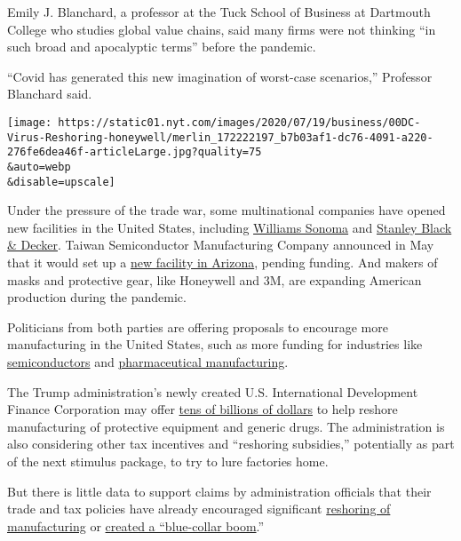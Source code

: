 Emily J. Blanchard, a professor at the Tuck School of Business at
Dartmouth College who studies global value chains, said many firms were
not thinking ``in such broad and apocalyptic terms'' before the
pandemic.

``Covid has generated this new imagination of worst-case scenarios,''
Professor Blanchard said.

\texttt{[image: https://static01.nyt.com/images/2020/07/19/business/00DC-Virus-Reshoring-honeywell/merlin\_172222197\_b7b03af1-dc76-4091-a220-276fe6dea46f-articleLarge.jpg?quality=75\\\&auto=webp\\\&disable=upscale]}

Under the pressure of the trade war, some multinational companies have
opened new facilities in the United States, including
\href{https://www.cnbc.com/2019/05/13/williams-sonoma-ceo-says-it-shifted-operations-ahead-of-tariff-hikes.html}{Williams
Sonoma} and
\href{https://www.wsj.com/articles/stanley-to-make-more-craftsman-tools-in-u-s-11557919800}{Stanley
Black \& Decker}. Taiwan Semiconductor Manufacturing Company announced
in May that it would set up a
\href{https://www.nytimes.com/2020/05/14/technology/trump-tsmc-us-chip-facility.html}{new
facility in Arizona}, pending funding. And makers of masks and
protective gear, like Honeywell and 3M, are expanding American
production during the pandemic.

Politicians from both parties are offering proposals to encourage more
manufacturing in the United States, such as more funding for industries
like
\href{https://www.nytimes.com/2020/06/11/business/economy/semiconductors-chips-congress-china.html}{semiconductors}
and
\href{https://www.nytimes.com/2020/03/11/business/economy/coronavirus-china-trump-drugs.html}{pharmaceutical
manufacturing}.

The Trump administration's newly created U.S. International Development
Finance Corporation may offer
\href{https://www.reuters.com/article/us-usa-trade-reshoring-exclusive/exclusive-u-s-development-agency-could-loan-billions-for-reshoring-official-says-idUSKBN23U31F}{tens
of billions of dollars} to help reshore manufacturing of protective
equipment and generic drugs. The administration is also considering
other tax incentives and ``reshoring subsidies,'' potentially as part of
the next stimulus package, to try to lure factories home.

But there is little data to support claims by administration officials
that their trade and tax policies have already encouraged significant
\href{https://www.nytimes.com/2020/05/11/opinion/coronavirus-jobs-offshoring.html}{reshoring
of manufacturing} or
\href{https://www.nytimes.com/2020/06/16/business/economy/trump-trade-tariffs.html}{created
a ``blue-collar boom}.''

